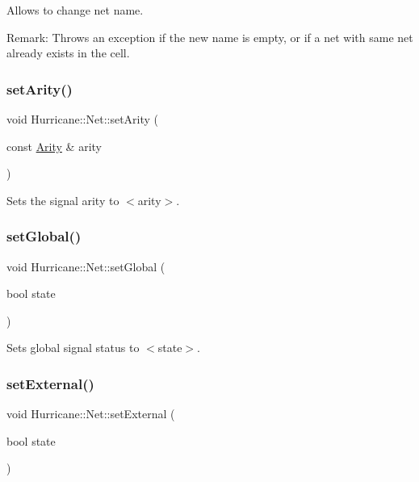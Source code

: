 Allows to change net name.

\begin{DoxyParagraph}{Remark\+: Throws an exception if the new name is empty, or if a net }
with same net already exists in the cell. 
\end{DoxyParagraph}
\mbox{\label{classHurricane_1_1Net_af5dfdca4401902ee7e1e46a1a486da38}} 
\subsubsection{\texorpdfstring{set\+Arity()}{setArity()}}
{\footnotesize\ttfamily void Hurricane\+::\+Net\+::set\+Arity (\begin{DoxyParamCaption}\item[{const \mbox{\hyperlink{classHurricane_1_1Net_a3a242d929e0c733f90f3f69be8cc427b}{Arity}} \&}]{arity }\end{DoxyParamCaption})}

Sets the signal arity to {\ttfamily $<$arity$>$}. \mbox{\label{classHurricane_1_1Net_a35c84afd9dade0cb715602bcf8ec8865}} 
\subsubsection{\texorpdfstring{set\+Global()}{setGlobal()}}
{\footnotesize\ttfamily void Hurricane\+::\+Net\+::set\+Global (\begin{DoxyParamCaption}\item[{bool}]{state }\end{DoxyParamCaption})}

Sets global signal status to {\ttfamily $<$state$>$}. \mbox{\label{classHurricane_1_1Net_a6a30bc8282ce7e4b936e73a11549fedf}} 
\subsubsection{\texorpdfstring{set\+External()}{setExternal()}}
{\footnotesize\ttfamily void Hurricane\+::\+Net\+::set\+External (\begin{DoxyParamCaption}\item[{bool}]{state }\end{DoxyParamCaption})}

